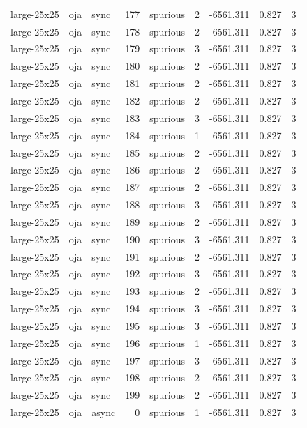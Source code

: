 \begin{tabular}{lllrlrrrr}
large-25x25 & oja & sync & 177 & spurious & 2 & -6561.311 & 0.827 & 3 \\
large-25x25 & oja & sync & 178 & spurious & 2 & -6561.311 & 0.827 & 3 \\
large-25x25 & oja & sync & 179 & spurious & 3 & -6561.311 & 0.827 & 3 \\
large-25x25 & oja & sync & 180 & spurious & 2 & -6561.311 & 0.827 & 3 \\
large-25x25 & oja & sync & 181 & spurious & 2 & -6561.311 & 0.827 & 3 \\
large-25x25 & oja & sync & 182 & spurious & 2 & -6561.311 & 0.827 & 3 \\
large-25x25 & oja & sync & 183 & spurious & 3 & -6561.311 & 0.827 & 3 \\
large-25x25 & oja & sync & 184 & spurious & 1 & -6561.311 & 0.827 & 3 \\
large-25x25 & oja & sync & 185 & spurious & 2 & -6561.311 & 0.827 & 3 \\
large-25x25 & oja & sync & 186 & spurious & 2 & -6561.311 & 0.827 & 3 \\
large-25x25 & oja & sync & 187 & spurious & 2 & -6561.311 & 0.827 & 3 \\
large-25x25 & oja & sync & 188 & spurious & 3 & -6561.311 & 0.827 & 3 \\
large-25x25 & oja & sync & 189 & spurious & 2 & -6561.311 & 0.827 & 3 \\
large-25x25 & oja & sync & 190 & spurious & 3 & -6561.311 & 0.827 & 3 \\
large-25x25 & oja & sync & 191 & spurious & 2 & -6561.311 & 0.827 & 3 \\
large-25x25 & oja & sync & 192 & spurious & 3 & -6561.311 & 0.827 & 3 \\
large-25x25 & oja & sync & 193 & spurious & 2 & -6561.311 & 0.827 & 3 \\
large-25x25 & oja & sync & 194 & spurious & 3 & -6561.311 & 0.827 & 3 \\
large-25x25 & oja & sync & 195 & spurious & 3 & -6561.311 & 0.827 & 3 \\
large-25x25 & oja & sync & 196 & spurious & 1 & -6561.311 & 0.827 & 3 \\
large-25x25 & oja & sync & 197 & spurious & 3 & -6561.311 & 0.827 & 3 \\
large-25x25 & oja & sync & 198 & spurious & 2 & -6561.311 & 0.827 & 3 \\
large-25x25 & oja & sync & 199 & spurious & 2 & -6561.311 & 0.827 & 3 \\
large-25x25 & oja & async & 0 & spurious & 1 & -6561.311 & 0.827 & 3 \\

\end{tabular}
